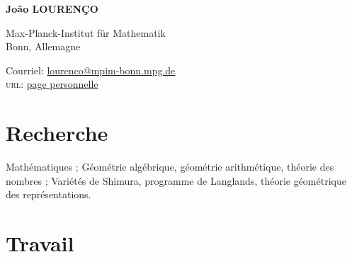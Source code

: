\documentclass[12pt]{article} %
\begin{document}

{\LARGE\bfseries João LOURENÇO} %
\bigskip\bigskip\medskip %

Max-Planck-Institut für Mathematik\\ %
 Bonn, Allemagne
\medskip %


Courriel: \href{mailto:lourenco@mpim-bonn.mpg.de}{lourenco@mpim-bonn.mpg.de}\\ %
\textsc{url}: \href{https://rastrel.github.io/Lourenco/}{page personnelle}\\ %







\section*{Recherche}

Mathématiques ; Géométrie algébrique, géométrie arithmétique, théorie des nombres ; Variétés de Shimura, programme de Langlands, théorie géométrique des représentations. %


\section*{Travail}
\end{document}
